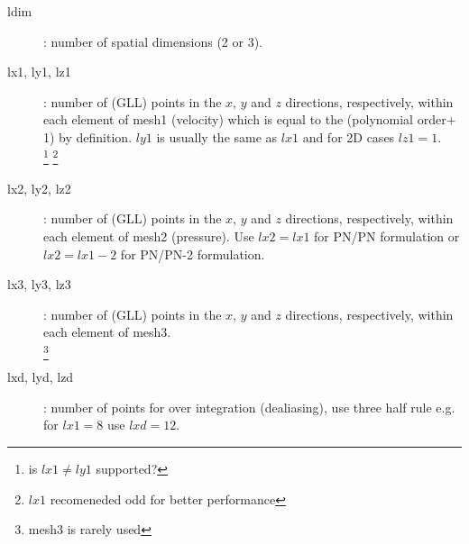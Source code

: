 

\begin{description}
\item [ldim]: number of spatial dimensions (2 or 3).%
\item [lx1, ly1, lz1]: number of (GLL) points in the $x$, $y$ and $z$ directions, respectively, within each element of mesh1 (velocity) which is equal to the (polynomial order$+$1) by definition. $ly1$ is usually the same as $lx1$ and for 2D cases $lz1=1$. \\
\footnote{is $lx1\ne ly1$ supported?}
\footnote{$lx1$ recomeneded odd for better performance}
\item [lx2, ly2, lz2]: number of (GLL) points in the $x$, $y$ and $z$ directions, respectively, within each element of mesh2 (pressure). Use $lx2=lx1$ for PN/PN formulation or $lx2=lx1-2$ for PN/PN-2 formulation.
\item [lx3, ly3, lz3]: number of (GLL) points in the $x$, $y$ and $z$ directions, respectively, within each element of mesh3.\\
\footnote{mesh3 is rarely used}
\item [lxd, lyd, lzd]: number of points for over integration (dealiasing), use three half rule e.g. for $lx1=8$ use $lxd=12$.\\


\end{description}
